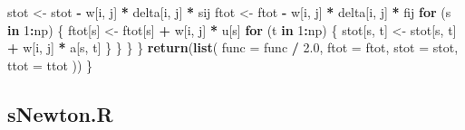 \documentclass[
  12pt,
]{article}
\newenvironment{Shaded}{\begin{snugshade}}{\end{snugshade}}
\newcommand{\AttributeTok}[1]{\textcolor[rgb]{0.13,0.29,0.53}{#1}}
\newcommand{\ControlFlowTok}[1]{\textcolor[rgb]{0.13,0.29,0.53}{\textbf{#1}}}
\newcommand{\DecValTok}[1]{\textcolor[rgb]{0.00,0.00,0.81}{#1}}
\newcommand{\FloatTok}[1]{\textcolor[rgb]{0.00,0.00,0.81}{#1}}
\newcommand{\FunctionTok}[1]{\textcolor[rgb]{0.13,0.29,0.53}{\textbf{#1}}}
\newcommand{\NormalTok}[1]{#1}
\newcommand{\OtherTok}[1]{\textcolor[rgb]{0.56,0.35,0.01}{#1}}
\newcommand{\SpecialCharTok}[1]{\textcolor[rgb]{0.81,0.36,0.00}{\textbf{#1}}}
\begin{document}
\begin{Shaded}
\begin{Highlighting}[]
\NormalTok{      stot }\OtherTok{\textless{}{-}}\NormalTok{ stot }\SpecialCharTok{{-}}\NormalTok{ w[i, j] }\SpecialCharTok{*}\NormalTok{ delta[i, j] }\SpecialCharTok{*}\NormalTok{ sij}
\NormalTok{      ftot }\OtherTok{\textless{}{-}}\NormalTok{ ftot }\SpecialCharTok{{-}}\NormalTok{ w[i, j] }\SpecialCharTok{*}\NormalTok{ delta[i, j] }\SpecialCharTok{*}\NormalTok{ fij}
      \ControlFlowTok{for}\NormalTok{ (s }\ControlFlowTok{in} \DecValTok{1}\SpecialCharTok{:}\NormalTok{np) \{}
\NormalTok{        ftot[s] }\OtherTok{\textless{}{-}}\NormalTok{ ftot[s] }\SpecialCharTok{+}\NormalTok{ w[i, j] }\SpecialCharTok{*}\NormalTok{ u[s]}
        \ControlFlowTok{for}\NormalTok{ (t }\ControlFlowTok{in} \DecValTok{1}\SpecialCharTok{:}\NormalTok{np) \{}
\NormalTok{          stot[s, t] }\OtherTok{\textless{}{-}}\NormalTok{ stot[s, t] }\SpecialCharTok{+}\NormalTok{ w[i, j] }\SpecialCharTok{*}\NormalTok{ a[s, t]}
\NormalTok{        \}}
\NormalTok{      \}}
\NormalTok{    \}}
\NormalTok{  \}}
  \FunctionTok{return}\NormalTok{(}\FunctionTok{list}\NormalTok{(}
    \AttributeTok{func =}\NormalTok{ func }\SpecialCharTok{/} \FloatTok{2.0}\NormalTok{,}
    \AttributeTok{ftot =}\NormalTok{ ftot,}
    \AttributeTok{stot =}\NormalTok{ stot,}
    \AttributeTok{ttot =}\NormalTok{ ttot}
\NormalTok{  ))}
\NormalTok{\}}
\end{Highlighting}
\end{Shaded}

\subsection{sNewton.R}\label{snewton.r}
\end{document}
